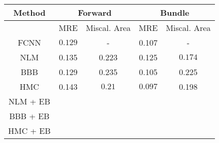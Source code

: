 \documentclass[convert={outext=.png}]{standalone}
\begin{document}
\begin{tabular}{c c c c c}
\hline
\hline
Method &  \multicolumn{2}{c}{Forward} & \multicolumn{2}{c}{Bundle} \\ \hline
 & MRE & Miscal. Area & MRE & Miscal. Area \\
 FCNN & $\mathbf{0.129}$ & - & 0.107 & - \\
 \hline
 NLM & 0.135 & 0.223 & 0.125 & $\mathbf{0.174}$ \\
 BBB & 0.129 & 0.235 & 0.105 & 0.225 \\
 HMC & 0.143 & $\mathbf{0.21}$ & $\mathbf{0.097}$ & 0.198 \\
 \hline
 NLM + EB &  &  &  &  \\
 BBB + EB &  &  &  &  \\
 HMC + EB &  &  &  &  \\
\hline
\hline
\end{tabular}
\end{document}
